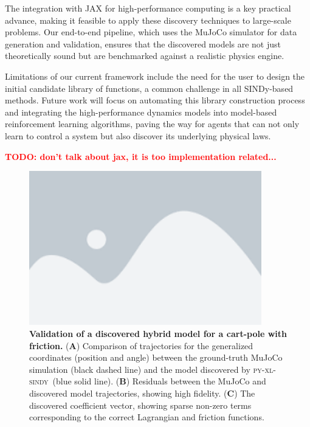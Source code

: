 \documentclass[12pt]{article}
\newcommand{\frameworkname}{\textsc{py-xl-sindy}}
\newcommand{\TODO}[1]{\textbf{\textcolor{red}{\Large TODO: \normalsize #1}}}
\begin{document}
The integration with JAX for high-performance computing is a key practical advance, making it feasible to apply these discovery techniques to large-scale problems. Our end-to-end pipeline, which uses the MuJoCo simulator for data generation and validation, ensures that the discovered models are not just theoretically sound but are benchmarked against a realistic physics engine.

Limitations of our current framework include the need for the user to design the initial candidate library of functions, a common challenge in all SINDy-based methods. Future work will focus on automating this library construction process and integrating the high-performance dynamics models into model-based reinforcement learning algorithms, paving the way for agents that can not only learn to control a system but also discover its underlying physical laws.

\TODO{don't talk about jax, it is too implementation related...}

\newpage


\begin{figure}
	\centering
	\includegraphics[width=0.9\textwidth]{placeholder.png}
	\caption{\textbf{Validation of a discovered hybrid model for a cart-pole with friction.} 
    (\textbf{A}) Comparison of trajectories for the generalized coordinates (position and angle) between the ground-truth MuJoCo simulation (black dashed line) and the model discovered by \frameworkname\ (blue solid line). (\textbf{B}) Residuals between the MuJoCo and discovered model trajectories, showing high fidelity. (\textbf{C}) The discovered coefficient vector, showing sparse non-zero terms corresponding to the correct Lagrangian and friction functions.}
	\label{fig:trajectory_validation}
\end{figure}
\end{document}
